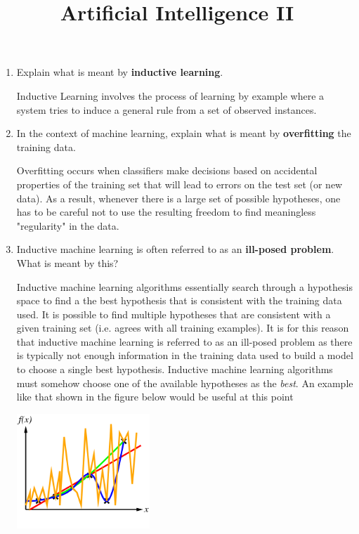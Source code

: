 \documentclass[--SOLUTION-OPTION--]{ditpaper}
\title{Artificial Intelligence II}
\begin{document}

\question
\begin{enumerate}
	\item Explain what is meant by \textbf{inductive learning}.
	\begin{answer}
		Inductive Learning involves the process of learning by example where a system tries to induce a general rule from a set of observed instances.
	\end{answer}
		\item In the context of machine learning, explain what is meant by \textbf{overfitting} the training data.
	\begin{answer}
		Overfitting occurs when classifiers make decisions based on accidental properties of the training set that will lead to errors on the test set (or new data). As a result, whenever there is a large set of possible hypotheses, one has to be careful not to use the resulting freedom to find meaningless "regularity" in the data.
	\end{answer}	
		\item  Inductive machine learning is often referred to as an \textbf{ill-posed problem}. What is meant by this?
	\begin{answer}
		Inductive machine learning algorithms essentially search through a hypothesis space to find a the best hypothesis that is consistent with the training data used. It is possible to find multiple hypotheses that are  consistent with a given training set (i.e. agrees with all training examples).  It is for this reason that inductive machine learning is referred to as an ill-posed problem as there is typically not enough information in the training data used to build a model to choose a single best hypothesis. Inductive machine learning algorithms must somehow choose one of the available hypotheses as the \emph{best}. An example like that shown in the figure below would be useful at this point
		\begin{center}
			\includegraphics[width=5cm]{./images/curve-fitting5.png}

\end{center}
\end{answer}
\end{enumerate}
\end{document}

